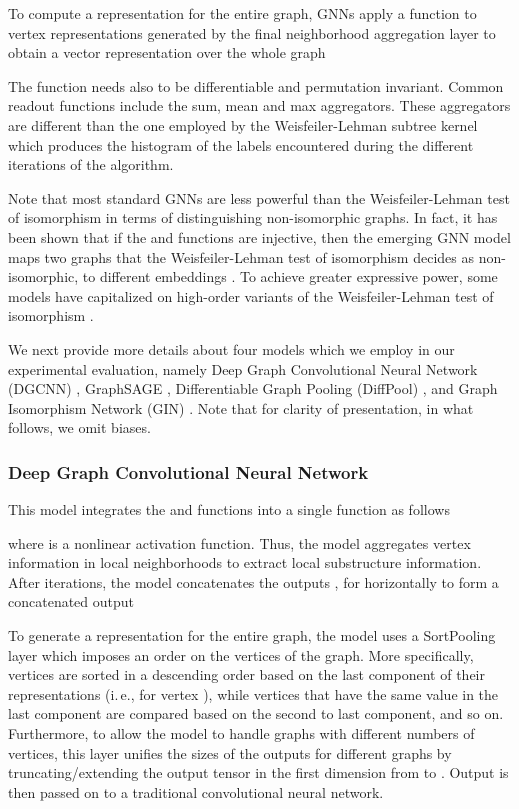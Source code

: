 \documentclass[twoside,11pt]{article}
\newcommand{\ie}{i.\,e., }
\begin{document}
To compute a representation for the entire graph, GNNs apply a  function to vertex representations generated by the final neighborhood aggregation layer to obtain a vector representation over the whole graph

The  function needs also to be differentiable and permutation invariant.
Common readout functions include the sum, mean and max aggregators.
These aggregators are different than the one employed by the Weisfeiler-Lehman subtree kernel which produces the histogram of the labels encountered during the different iterations of the algorithm.

Note that most standard GNNs are less powerful than the Weisfeiler-Lehman test of isomorphism in terms of distinguishing non-isomorphic graphs.
In fact, it has been shown that if the  and  functions are injective, then the emerging GNN model maps two graphs that the Weisfeiler-Lehman test of isomorphism decides as non-isomorphic, to different embeddings .
To achieve greater expressive power, some models have capitalized on high-order variants of the Weisfeiler-Lehman test of isomorphism .

We next provide more details about four models which we employ in our experimental evaluation, namely Deep Graph Convolutional Neural Network (DGCNN) , GraphSAGE , Differentiable Graph Pooling (DiffPool) , and Graph Isomorphism Network (GIN) .
Note that for clarity of presentation, in what follows, we omit biases.

\subsubsection{Deep Graph Convolutional Neural Network}
This model integrates the  and  functions into a single function as follows

where  is a nonlinear activation function.
Thus, the model aggregates vertex information in local neighborhoods to extract local substructure information.
After  iterations, the model concatenates the outputs , for  horizontally to form a concatenated output

To generate a representation for the entire graph, the model uses a SortPooling layer which imposes an order on the vertices of the graph.
More specifically, vertices are sorted in a descending order based on the last component of their representations (\ie  for vertex ), while vertices that have the same value in the last component are compared based on the second to last component, and so on.
Furthermore, to allow the model to handle graphs with different numbers of vertices, this layer unifies the sizes of the outputs for different graphs by truncating/extending the output tensor in the first dimension from  to .
Output is then passed on to a traditional convolutional neural network.
\end{document}
